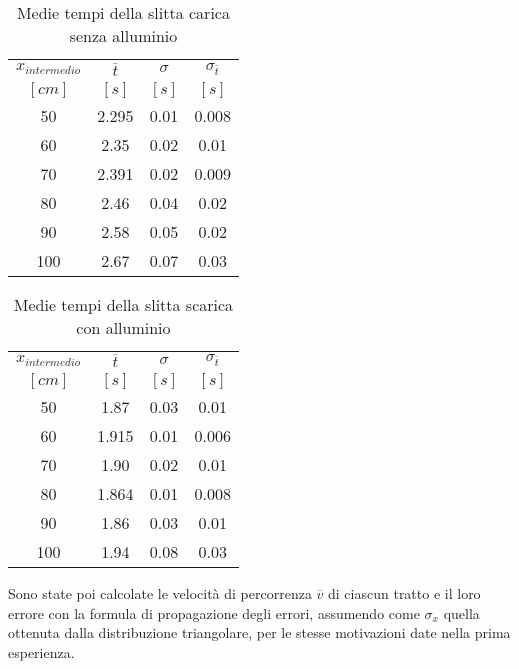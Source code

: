 \documentclass[a4paper,11pt,oneside]{article}
\begin{document}
\begin{table}[h!]%
\centering
\begin{tabular}{c|ccc}
\toprule
$x_{intermedio}$&$\overline{t}$&$\sigma$&$\sigma_{\overline{t}}$\\
$[\si{cm}]$&$[\si{s}]$&$[\si{s}]$&$[\si{s}]$\\
\midrule
50	&2.295 	&0.01	&0.008\\
60	&2.35	&0.02	&0.01\\
70	&2.391	&0.02	&0.009\\
80	&2.46     &0.04	&0.02\\
90  &2.58	&0.05	&0.02\\
100	&2.67	&0.07	&0.03\\
\bottomrule
\end{tabular}
    \caption{Medie tempi della slitta carica senza alluminio}
    \label{tab:sm_na}
\end{table}

\begin{table}[h!]%
\centering
\begin{tabular}{c|ccc}
\toprule
$x_{intermedio}$&$\overline{t}$&$\sigma$&$\sigma_{\overline{t}}$\\
$[\si{cm}]$&$[\si{s}]$&$[\si{s}]$&$[\si{s}]$\\
\midrule
50	&1.87	&0.03	&0.01\\
60	&1.915	&0.01	&0.006\\
70	&1.90	&0.02	&0.01\\
80	&1.864	&0.01	&0.008\\
90	&1.86	&0.03	&0.01\\
100	&1.94	    &0.08	&0.03\\
\bottomrule
\end{tabular}
    \caption{Medie tempi della slitta scarica con alluminio}
    \label{tab:nm_sa}
\end{table}


Sono state poi calcolate le velocità di percorrenza $\overline{v}$ di ciascun tratto e il loro errore con la formula di propagazione degli errori, assumendo come $\sigma_{x}$ quella ottenuta dalla distribuzione triangolare, per le stesse motivazioni date nella prima esperienza.\\
\end{document}
